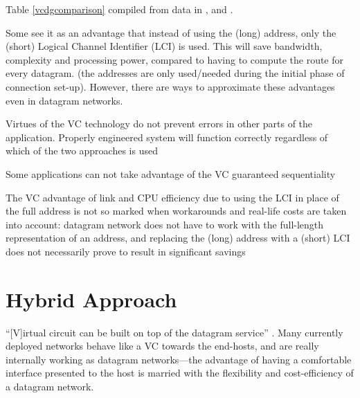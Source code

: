 \documentclass[10pt]{report}
\begin{document}
Table \ref{vcdgcomparison} compiled from data in \cite{kurose},
\cite[p298--299]{stallings} and \cite{russell}.

Some see it as an advantage that instead of using the (long) address, only the
(short) Logical Channel Identifier (LCI) is used.  This will save bandwidth,
complexity and processing power, compared to having to compute the route for
every datagram. \cite[p158]{russell} (the addresses are only used/needed during
the initial phase of connection set-up).  However, there are ways to approximate
these advantages even in datagram networks.

Virtues of the VC technology do not prevent errors in other parts of
the application.  Properly engineered system will function correctly
regardless of which of the two approaches is used \cite[p161]{russell}

Some applications can not take advantage of the VC guaranteed
sequentiality \cite[p161]{russell}

The VC advantage of link and CPU efficiency due to using the LCI in
place of the full address is not so marked when workarounds and
real-life costs are taken into account: datagram network does not have
to work with the full-length representation of an address, and replacing
the (long) address with a (short) LCI does not necessarily prove to
result in significant savings \cite[p161]{russell}

\section{Hybrid Approach}

``[V]irtual circuit can be built on top of the datagram service''
\cite[p141]{russell}.  Many currently deployed networks behave like a VC towards the end-hosts,
and are really internally working as datagram networks---the advantage
of having a comfortable interface presented to the host is married with
the flexibility and cost-efficiency of a datagram network.



\end{document}
